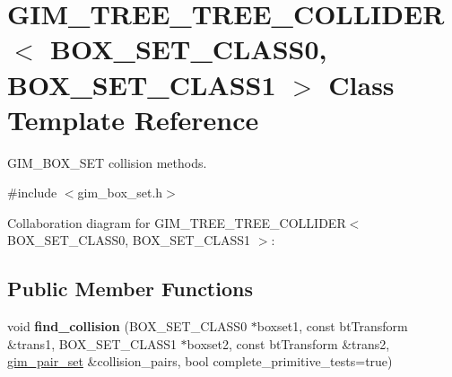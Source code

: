 \hypertarget{class_g_i_m___t_r_e_e___t_r_e_e___c_o_l_l_i_d_e_r}{\section{G\+I\+M\+\_\+\+T\+R\+E\+E\+\_\+\+T\+R\+E\+E\+\_\+\+C\+O\+L\+L\+I\+D\+E\+R$<$ B\+O\+X\+\_\+\+S\+E\+T\+\_\+\+C\+L\+A\+S\+S0, B\+O\+X\+\_\+\+S\+E\+T\+\_\+\+C\+L\+A\+S\+S1 $>$ Class Template Reference}
\label{class_g_i_m___t_r_e_e___t_r_e_e___c_o_l_l_i_d_e_r}
}


G\+I\+M\+\_\+\+B\+O\+X\+\_\+\+S\+E\+T collision methods.  




{\ttfamily \#include $<$gim\+\_\+box\+\_\+set.\+h$>$}



Collaboration diagram for G\+I\+M\+\_\+\+T\+R\+E\+E\+\_\+\+T\+R\+E\+E\+\_\+\+C\+O\+L\+L\+I\+D\+E\+R$<$ B\+O\+X\+\_\+\+S\+E\+T\+\_\+\+C\+L\+A\+S\+S0, B\+O\+X\+\_\+\+S\+E\+T\+\_\+\+C\+L\+A\+S\+S1 $>$\+:
\subsection*{Public Member Functions}
\begin{DoxyCompactItemize}
\item 
\hypertarget{class_g_i_m___t_r_e_e___t_r_e_e___c_o_l_l_i_d_e_r_a1933e264be37ab4761b099974de6e164}{void {\bfseries find\+\_\+collision} (B\+O\+X\+\_\+\+S\+E\+T\+\_\+\+C\+L\+A\+S\+S0 $\ast$boxset1, const bt\+Transform \&trans1, B\+O\+X\+\_\+\+S\+E\+T\+\_\+\+C\+L\+A\+S\+S1 $\ast$boxset2, const bt\+Transform \&trans2, \hyperlink{classgim__pair__set}{gim\+\_\+pair\+\_\+set} \&collision\+\_\+pairs, bool complete\+\_\+primitive\+\_\+tests=true)}\label{class_g_i_m___t_r_e_e___t_r_e_e___c_o_l_l_i_d_e_r_a1933e264be37ab4761b099974de6e164}

\end{DoxyCompactItemize}
